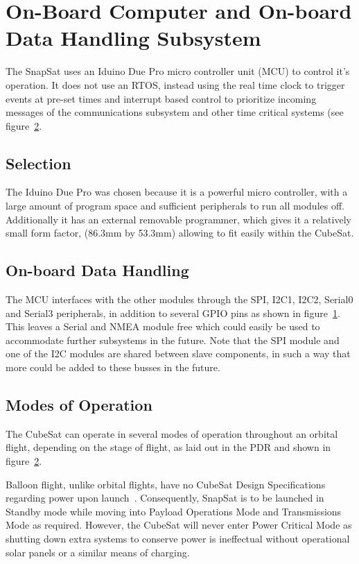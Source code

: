\section{On-Board Computer and On-board Data Handling Subsystem}

The SnapSat uses an Iduino Due Pro micro controller unit (MCU) to control it's operation.  It does not use an RTOS, instead using the real time clock to trigger events at pre-set times and interrupt based control to prioritize incoming messages of the communications subsystem and other time critical systems (see figure~\ref{fig:modes}.

\subsection{Selection}

The Iduino Due Pro was chosen because it is a powerful micro controller, with a large amount of program space and sufficient peripherals to run all modules off.  Additionally it has an external removable programmer, which gives it a relatively small form factor, (86.3mm by 53.3mm) allowing to fit easily within the CubeSat.

\subsection{On-board Data Handling}

The MCU interfaces with the other modules through the SPI, I2C1, I2C2, Serial0 and Serial3 peripherals, in addition to several GPIO pins as shown in figure~\ref{fig:mcucon}.  This leaves a Serial and NMEA module free which could easily be used to accommodate further subsystems in the future.  Note that the SPI module and one of the I2C modules are shared between slave components, in such a way that more could be added to these busses in the future.

\begin{figure}[H]
	\label{fig:mcucon}
\end{figure}

\subsection{Modes of Operation}

The CubeSat can operate in several modes of operation throughout an orbital flight, depending on the stage of flight, as laid out in the PDR and shown in figure~\ref{fig:modes}.

\begin{figure}[H]
	\label{fig:modes}
\end{figure}

Balloon flight, unlike orbital flights, have no CubeSat Design Specifications regarding power upon launch~\cite{cds}.  Consequently, SnapSat is to be launched in Standby mode while moving into Payload Operations Mode and Transmissions Mode as required.  However, the CubeSat will never enter Power Critical Mode as shutting down extra systems to conserve power is ineffectual without operational solar panels or a similar means of charging.